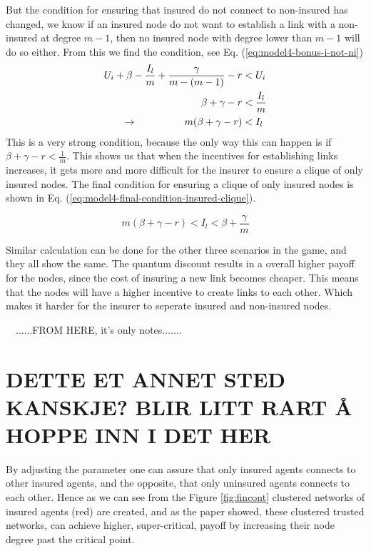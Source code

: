 But the condition for ensuring that insured do not connect to non-insured has changed, we know if an insured node do not want to establish a link with a non-insured at degree $m-1$, then no insured node with degree lower than $m-1$ will do so either. From this we find the condition, see Eq. (\ref{eq:model4-bonus-i-not-ni})
\begin{eqnarray}
U_{i}+\beta-\frac{I_{l}}{m}+\frac{\gamma}{m-(m-1)}-r&<U_{i} \nonumber \\ 
\beta+\gamma-r&<\frac{I_{l}}{m}\nonumber \\ 
\llap{$\rightarrow$\hspace{50pt}}m(\beta +\gamma-r)&<I_{l}\nonumber
\label{eq:model4-bonus-i-not-ni}
\end{eqnarray}
This is a very strong condition, because the only way this can happen is if $\beta+\gamma-r<\frac{1}{m}$.  This shows us that when the incentives for establishing links increases, it gets more and more difficult for the insurer to ensure a clique of only insured nodes. 
The final condition for ensuring a clique of only insured nodes is shown in Eq. (\ref{eq:model4-final-condition-insured-clique}).

\begin{equation}
m(\beta +\gamma-r)<I_{l}<\beta+\frac{\gamma}{m}
\label{eq:model4-final-condition-insured-clique}
\end{equation}

Similar calculation can be done for the other three scenarios in the game, and they all show the same. The quantum discount results in a overall higher payoff for the nodes, since the cost of insuring a new link becomes cheaper. This means that the nodes will have a higher incentive to create links to each other. Which makes it harder for the insurer to seperate insured and non-insured nodes.







\
\
......FROM HERE, it's only notes.......
\section{DETTE ET ANNET STED KANSKJE? BLIR LITT RART Å HOPPE INN I DET HER}
By adjusting the parameter one can assure that only insured agents connects to other insured agents, and the opposite,
that only uninsured agents connects to each other. Hence as we can see from the Figure \ref{fig:fincont} clustered
networks of insured agents (red) are created, and  as the paper \cite{contagion} showed, these clustered trusted
networks, can achieve higher, super-critical, payoff by increasing their node degree past the critical point.

